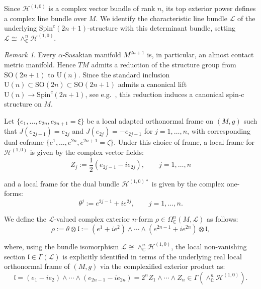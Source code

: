 \documentclass[10pt,a4paper,twoside,reqno]{amsart}
\theoremstyle{plain}
\theoremstyle{definition}
\theoremstyle{remark}
\newtheorem{remark}[thm]{Remark}
\begin{document}
\noindent
Since $\mathcal{H} ^{(1,0)}$ is a complex vector bundle of rank $n$, its top exterior power defines a complex line bundle over $M$. We identify the characteristic line bundle $\mathcal{L}$ of the underlying $\mathrm{Spin}^c(2n+1)$-structure with this determinant bundle, setting $\mathcal{L} \cong \wedge^n_{\mathbb{C}} \mathcal{H} ^{(1,0)}$.

\begin{remark}
Every $\alpha$-Sasakian manifold $M^{2n+1}$ is, in particular, an almost contact metric manifold. Hence $TM$ admits a reduction of the structure group from $\mathrm{SO}(2n+1)$ to $\mathrm{U}(n)$. Since the standard inclusion $\mathrm{U}(n)\subset\mathrm{SO}(2n)\subset \mathrm{SO}(2n+1)$ admits a canonical lift $\mathrm{U}(n)\to\mathrm{Spin}^{c}(2n+1)$, see e.g.\ \cite{Spin89}, this reduction induces a canonical spin-c structure on $M$.
\end{remark}

Let $\{e_1,\ldots,e_{2n},e_{2n+1}=\xi\}$ be a local adapted orthonormal frame on $(M,g)$ such that $J(e_{2j-1}) = e_{2j}$ and $J(e_{2j}) = -e_{2j-1}$ for $j=1, \ldots, n$, with corresponding dual coframe $\{e^1,\ldots,e^{2n},e^{2n+1}=\zeta\}$. Under this choice of frame, a local frame for $\mathcal{H}^{(1,0)}$ is given by the complex vector fields:
\begin{equation*}
Z_j := \frac{1}{2}(e_{2j-1} - ie_{2j}), \qquad j=1, \ldots, n
\end{equation*}

\noindent
and a local frame for the dual bundle $\mathcal{H}^{(1,0)\ast}$ is given by the complex one-forms:
\begin{equation*}
\theta^j := e^{2j-1} + ie^{2j}, \qquad j=1, \ldots, n.
\end{equation*}

\noindent
We define the $\mathcal{L}$-valued complex exterior $n$-form $\rho \in \Omega^n_{\mathbb{C}}(M, \mathcal{L})$ as follows:
\begin{equation*}
\rho := \theta \otimes \mathfrak{l} := (e^1 + i e^2) \wedge \cdots \wedge (e^{2n-1} + i e^{2n}) \otimes \mathfrak{l},
\end{equation*}

\noindent
where, using the bundle isomorphism $\mathcal{L} \cong \wedge^n_{\mathbb{C}} \mathcal{H} ^{(1,0)}$, the local non-vanishing section $\mathfrak{l} \in \Gamma(\mathcal{L})$ is explicitly identified in terms of the underlying real local orthonormal frame of $(M,g)$ via the complexified exterior product as:
\begin{equation*}
\mathfrak{l} = (e_1 - i e_2) \wedge \cdots \wedge (e_{2n-1} - i e_{2n}) = 2^n Z_1 \wedge \cdots \wedge Z_n \in \Gamma(\wedge^n_{\mathbb{C}} \mathcal{H} ^{(1,0)}).
\end{equation*}
\end{document}
